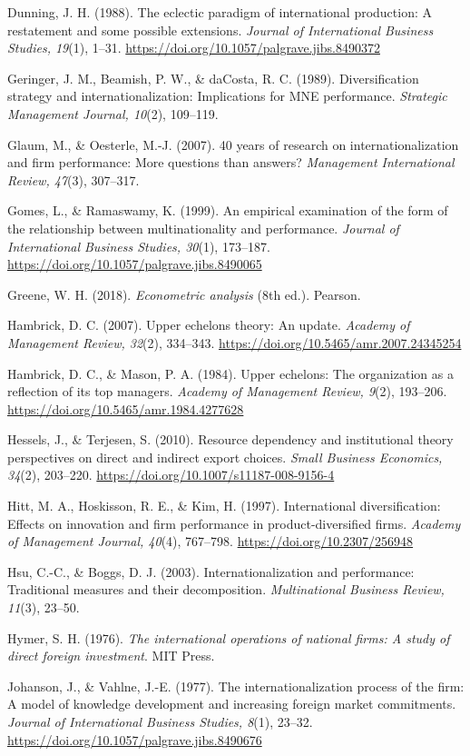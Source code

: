 \documentclass[
  a4paper,
  13pt]{extreport}
\begin{document}
Dunning, J. H. (1988). The eclectic paradigm of international
production: A restatement and some possible extensions. \emph{Journal of
International Business Studies, 19}(1), 1--31.
\url{https://doi.org/10.1057/palgrave.jibs.8490372}

Geringer, J. M., Beamish, P. W., \& daCosta, R. C. (1989).
Diversification strategy and internationalization: Implications for MNE
performance. \emph{Strategic Management Journal, 10}(2), 109--119.

Glaum, M., \& Oesterle, M.-J. (2007). 40 years of research on
internationalization and firm performance: More questions than answers?
\emph{Management International Review, 47}(3), 307--317.

Gomes, L., \& Ramaswamy, K. (1999). An empirical examination of the form
of the relationship between multinationality and performance.
\emph{Journal of International Business Studies, 30}(1), 173--187.
\url{https://doi.org/10.1057/palgrave.jibs.8490065}

Greene, W. H. (2018). \emph{Econometric analysis} (8th ed.). Pearson.

Hambrick, D. C. (2007). Upper echelons theory: An update. \emph{Academy
of Management Review, 32}(2), 334--343.
\url{https://doi.org/10.5465/amr.2007.24345254}

Hambrick, D. C., \& Mason, P. A. (1984). Upper echelons: The
organization as a reflection of its top managers. \emph{Academy of
Management Review, 9}(2), 193--206.
\url{https://doi.org/10.5465/amr.1984.4277628}

Hessels, J., \& Terjesen, S. (2010). Resource dependency and
institutional theory perspectives on direct and indirect export choices.
\emph{Small Business Economics, 34}(2), 203--220.
\url{https://doi.org/10.1007/s11187-008-9156-4}

Hitt, M. A., Hoskisson, R. E., \& Kim, H. (1997). International
diversification: Effects on innovation and firm performance in
product-diversified firms. \emph{Academy of Management Journal, 40}(4),
767--798. \url{https://doi.org/10.2307/256948}

Hsu, C.-C., \& Boggs, D. J. (2003). Internationalization and
performance: Traditional measures and their decomposition.
\emph{Multinational Business Review, 11}(3), 23--50.

Hymer, S. H. (1976). \emph{The international operations of national
firms: A study of direct foreign investment}. MIT Press.

Johanson, J., \& Vahlne, J.-E. (1977). The internationalization process
of the firm: A model of knowledge development and increasing foreign
market commitments. \emph{Journal of International Business Studies,
8}(1), 23--32. \url{https://doi.org/10.1057/palgrave.jibs.8490676}
\end{document}
